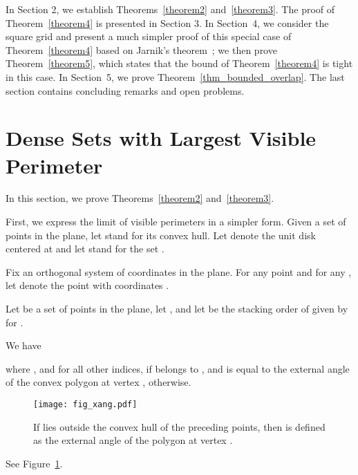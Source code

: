 \documentclass[11pt]{article}
\begin{document}
In Section 2, we establish Theorems~\ref{theorem2} and~\ref{theorem3}. The proof of Theorem~\ref{theorem4} is
presented in Section 3. In Section~4, we consider the square grid and present a
much simpler proof of this special case of Theorem~\ref{theorem4}
based on Jarnik's theorem~\cite{Ja25}; we then prove Theorem~\ref{theorem5}, which states that the
bound of Theorem~\ref{theorem4} is tight in this case. In Section~5, we prove Theorem~\ref{thm_bounded_overlap}. The last section contains concluding
remarks and open problems.

\section{Dense Sets with Largest Visible Perimeter}

In this section, we prove Theorems~\ref{theorem2} and~\ref{theorem3}.

First, we express the limit of visible perimeters in a simpler form. Given a set of points  in the plane, let 
stand for its convex hull. Let  denote the unit disk centered at
 and let  stand for the set .

Fix an orthogonal system of coordinates in the plane. For any point  and for any , let  denote the point with coordinates .


\begin{lem}\label{lemma2.1} Let  be a set of
  points in the plane, let , and let  be the stacking order of  given by  for .

We have

where , and for all other indices,  if  belongs to , and  is equal to the external angle of the convex polygon  at vertex , otherwise.
\end{lem}

\begin{figure}
\centerline{\texttt{[image: fig\_xang.pdf]}}
\caption{\label{fig_xang}If  lies outside the convex hull of the preceding points, then  is defined as the external angle of the polygon  at vertex .}
\end{figure}

See Figure~\ref{fig_xang}.
\end{document}
